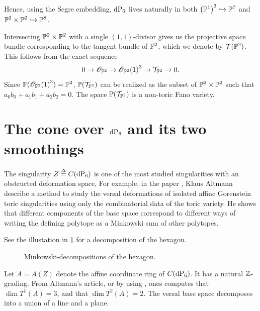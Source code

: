 Hence, using the Segre embedding, $\dP6$ lives naturally in both ${\left( \P^1 \right)}^3 \hookrightarrow \P^7$ and $\P^2 \times \P^2 \hookrightarrow \P^8$. 

\begin{remark}
Intersecting $\P^2 \times \P^2$ with a single $(1,1)$-divisor gives us the projective space bundle corresponding to the tangent bundle of $\P^2$, which we denote by $\mathcal T(\P^2)$. This follows from the exact sequence
\[
0 \to \OO_{\P^2} \to {\OO_{\P^2}(1)}^3 \to \mathcal T_{\P^2} \to 0.
\]
Since $\P({\OO_{\P^2}(1)}^3)=\P^2$,  $\P(\mathcal T_{\P^2})$ can be realized as the subset of $\P^2 \times \P^2$ such that $a_0b_0+a_1b_1+a_2b_2=0$. The space $\P(\mathcal T_{\P^2})$ is a non-toric Fano variety.
\end{remark}

\section{The cone over \texorpdfstring{$\dP6$}{dP6} and its two smoothings}

The singularity $Z\stackrel{\Delta}{=} C(\dP6)$ is one of the most studied singularities with an obstructed deformation space, For example, in the paper \cite{altmann_versaldeformation}, Klaus Altmann describe a method to study the versal deformations of isolated affine Gorenstein toric singularities using only the combinatorial data of the toric variety. He shows that different components of the base space correspond to different ways of writing the defining polytope as a Minkowski sum of other polytopes.

See the illustation in \cref{fig:minkowski_decompositions} for a decomposition of the hexagon.

\begin{figure}
\centering 

\caption{Minkowski-decompositions of the hexagon.}
\label{fig:minkowski_decompositions}
\end{figure}

Let $A=A(Z)$ denote the affine coordinate ring of $C(\dP6)$. It has a natural $\Z$-grading. From Altmann's article, or by using \MM, ones computes that $\dim T^1(A)=3$, and that $\dim T^2(A)=2$. The versal base space decomposes into a union of a line and a plane.


